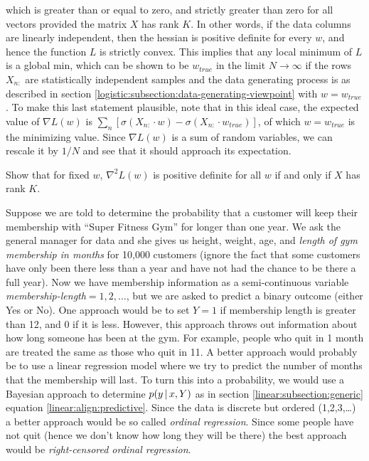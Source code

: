 which is greater than or equal to zero, and strictly greater than zero for all vectors provided the matrix $X$ has rank $K$.  In other words, if the data columns are linearly independent, then the hessian is positive definite for every $w$, and hence the function $L$ is strictly convex.  This implies that any local minimum of $L$ is a global min, which can be shown to be $w_{true}$ in the limit $N\to\infty$ if the rows $X_{n:}$ are statistically independent samples and the data generating process is as described in section \ref{logistic:subsection:data-generating-viewpoint} with $w=w_{true}$.  To make this last statement plausible, note that in this ideal case, the expected value of $\nabla L(w)$ is $\sum_n\left[ \sigma(X_{n:}\cdot w) - \sigma(X_{n:}\cdot w_{true}) \right]$, of which $w=w_{true}$ is the minimizing value.  Since $\nabla L(w)$ is a sum of random variables, we can rescale it by $1/N$ and see that it should approach its expectation.  

\begin{exercise}
  Show that for fixed $w$, $\nabla^2L(w)$ is positive definite for all $w$ if and only if $X$ has rank $K$.
\end{exercise}

\begin{digression*}
  Suppose we are told to determine the probability that a customer will keep their membership with ``Super Fitness Gym'' for longer than one year.  We ask the general manager for data and she gives us height, weight, age, and \emph{length of gym membership in months} for 10,000 customers (ignore the fact that some customers have only been there less than a year and have not had the chance to be there a full year).  Now we have membership information as a semi-continuous variable \emph{membership-length}$ = 1,2,\dots$, but we are asked to predict a binary outcome (either Yes or No).  One approach would be to set $Y = 1$ if membership length is greater than 12, and 0 if it is less.  However, this approach throws out information about how long someone has been at the gym.  For example, people who quit in 1 month are treated the same as those who quit in 11.  A better approach would probably be to use a linear regression model where we try to predict the number of months that the membership will last.  To turn this into a probability, we would use a Bayesian approach to determine $p(y{\,|\,} x, Y)$ as in section \ref{linear:subsection:generic} equation \eqref{linear:align:predictive}.  Since the data is discrete but ordered (1,2,3,\ldots) a better approach would be so called \emph{ordinal regression}.  Since some people have not quit (hence we don't know how long they will be there) the best approach would be \emph{right-censored ordinal regression}.
\end{digression*}

